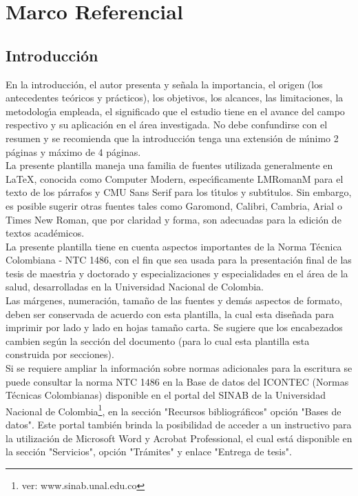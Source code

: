 

\chapter{Marco Referencial}
\section{Introducci\'on}

En la introducci\'{o}n, el autor presenta y se\~{n}ala la importancia, el origen (los antecedentes te\'{o}ricos y pr\'{a}cticos), los objetivos, los alcances, las limitaciones, la metodolog\'{\i}a empleada, el significado que el estudio tiene en el avance del campo respectivo y su aplicaci\'{o}n en el \'{a}rea investigada. No debe confundirse con el resumen y se recomienda que la introducci\'{o}n tenga una extensi\'{o}n de m\'{\i}nimo 2 p\'{a}ginas y m\'{a}ximo de 4 p\'{a}ginas.\\

La presente plantilla maneja una familia de fuentes utilizada generalmente en LaTeX, conocida como Computer Modern, espec\'{\i}ficamente LMRomanM para el texto de los p\'{a}rrafos y CMU Sans Serif para los t\'{\i}tulos y subt\'{\i}tulos. Sin embargo, es posible sugerir otras fuentes tales como Garomond, Calibri, Cambria, Arial o Times New Roman, que por claridad y forma, son adecuadas para la edici\'{o}n de textos acad\'{e}micos.\\

La presente plantilla tiene en cuenta aspectos importantes de la Norma T\'{e}cnica Colombiana - NTC 1486, con el fin que sea usada para la presentaci\'{o}n final de las tesis de maestr\'{\i}a y doctorado y especializaciones y especialidades en el \'{a}rea de la salud, desarrolladas en la Universidad Nacional de Colombia.\\

Las m\'{a}rgenes, numeraci\'{o}n, tama\~{n}o de las fuentes y dem\'{a}s aspectos de formato, deben ser conservada de acuerdo con esta plantilla, la cual esta dise\~{n}ada para imprimir por lado y lado en hojas tama\~{n}o carta. Se sugiere que los encabezados cambien seg\'{u}n la secci\'{o}n del documento (para lo cual esta plantilla esta construida por secciones).\\

Si se requiere ampliar la informaci\'{o}n sobre normas adicionales para la escritura se puede consultar la norma NTC 1486 en la Base de datos del ICONTEC (Normas T\'{e}cnicas Colombianas) disponible en el portal del SINAB de la Universidad Nacional de Colombia\footnote{ver: www.sinab.unal.edu.co}, en la secci\'{o}n "Recursos bibliogr\'{a}ficos" opci\'{o}n "Bases de datos".  Este portal tambi\'{e}n brinda la posibilidad de acceder a un instructivo para la utilizaci\'{o}n de Microsoft Word y Acrobat Professional, el cual est\'{a} disponible en la secci\'{o}n "Servicios", opci\'{o}n "Tr\'{a}mites" y enlace "Entrega de tesis".\\

